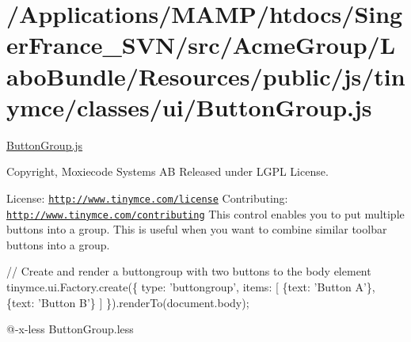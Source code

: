 \hypertarget{_2_applications_2_m_a_m_p_2htdocs_2_singer_france__s_v_n_2src_2_acme_group_2_labo_bundle_2_resou092db21b076335742a22d241a3c85aaf}{\section{/\+Applications/\+M\+A\+M\+P/htdocs/\+Singer\+France\+\_\+\+S\+V\+N/src/\+Acme\+Group/\+Labo\+Bundle/\+Resources/public/js/tinymce/classes/ui/\+Button\+Group.\+js}
}
\hyperlink{_button_group_8js}{Button\+Group.\+js}

Copyright, Moxiecode Systems A\+B Released under L\+G\+P\+L License.

License\+: \href{http://www.tinymce.com/license}{\tt http\+://www.\+tinymce.\+com/license} Contributing\+: \href{http://www.tinymce.com/contributing}{\tt http\+://www.\+tinymce.\+com/contributing} This control enables you to put multiple buttons into a group. This is useful when you want to combine similar toolbar buttons into a group.

// Create and render a buttongroup with two buttons to the body element tinymce.\+ui.\+Factory.\+create(\{ type\+: 'buttongroup', items\+: \mbox{[} \{text\+: 'Button A'\}, \{text\+: 'Button B'\} \mbox{]} \}).render\+To(document.\+body);

@-\/x-\/less Button\+Group.\+less


\begin{DoxyCodeInclude}
\end{DoxyCodeInclude}
 